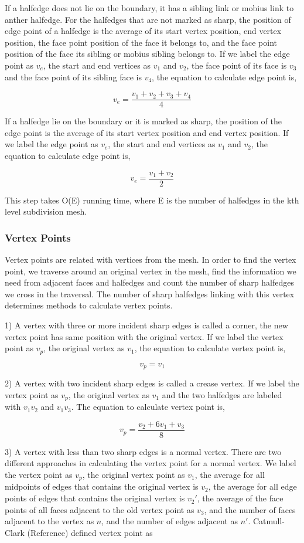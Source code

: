 \documentclass[12pt]{article}
\begin{document}
If a halfedge does not lie on the boundary, it has a sibling link or mobius link to anther halfedge. For the halfedges that are not marked as sharp, the position of edge point of a halfedge is the average of its start vertex position, end vertex position, the face point position of the face it belongs to, and the face point position of the face its sibling or mobius sibling belongs to. If we label the edge point as $v_e$, the start and end vertices as $v_1$ and $v_2$, the face point of its face is $v_3$ and the face point of its sibling face is $v_4$, the equation to calculate edge point is,

$$v_e = \frac{v_1 + v_2 + v_3 + v_4}{4}$$

If a halfedge lie on the boundary or it is marked as sharp, the position of the edge point is the average of its start vertex position and end vertex position. If we label the edge point as $v_e$, the start and end vertices as $v_1$ and $v_2$, the equation to calculate edge point is,

$$v_e = \frac{v_1 + v_2}{2}$$

This step takes O(E) running time, where E is the number of halfedges in the kth level subdivision mesh.

\subsubsection{Vertex Points}
Vertex points are related with vertices from the mesh. In order to find the vertex point, we traverse around an original vertex in the mesh, find the information we need from adjacent faces and halfedges and count the number of sharp halfedges we cross in the traversal. The number of sharp halfedges linking with this vertex determines methods to calculate vertex points.

1) A vertex with three or more incident sharp edges is called a corner, the new vertex point has same position with the original vertex. If we label the vertex point as $v_p$, the original vertex as $v_1$, the equation to calculate vertex point is,

$$v_p = v_1$$

2) A vertex with two incident sharp edges is called a crease vertex. If we label the vertex point as $v_p$, the original vertex as $v_1$ and the two halfedges are labeled with $v_1v_2$ and $v_1v_3$. The equation to calculate vertex point is,

$$v_p=\frac{v_2 + 6v_1 + v_3}{8}$$

3) A vertex with less than two sharp edges is a normal vertex. There are two different approaches in calculating the vertex point for a normal vertex. We label the vertex point as $v_p$, the original vertex point as $v_1$, the average for all midpoints of edges that contains the original vertex is $v_2$, the average for all edge points of edges that contains the original vertex is $v_2'$, the average of the face points of all faces adjacent to the old vertex point as $v_3$, and the number of faces adjacent to the vertex as $n$, and the number of edges adjacent as $n'$. Catmull-Clark (Reference) defined vertex point as 
\end{document}
